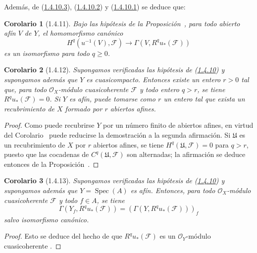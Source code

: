 \documentclass[10pt,oneside,openany]{book}
\theoremstyle{egaenv}\newtheorem*{env}{---}
\theoremstyle{egastatement}
\newtheorem*{corollary}{Corolario}
\theoremstyle{egadescription}
\renewcommand{\geq}{\geqslant}
\begin{document}
Además, de (\hyperref[III.1.4.10.3]{1.4.10.3}), (\hyperref[III.1.4.10.2]{1.4.10.2}) y (\hyperref[III.1.4.10.1]{1.4.10.1}) se deduce que:
\begin{corollary}[1.4.11]
\label{III.1.4.11}
\label{III.1.4.11-fr}
Bajo las hipótesis de la Proposición~, para todo abierto afín $V$ de $Y$, el homomorfismo canónico
\begin{equation}
\label{III.1.4.11.1-fr}
\tag{1.4.11.1}
H^q(u^{-1}(V),\mathcal F)\longrightarrow
\Gamma(V,R^qu_*(\mathcal F))
\end{equation}
es un isomorfismo para todo $q\geq0$.
\end{corollary}

\begin{corollary}[1.4.12]
\label{III.1.4.12-fr}
Supongamos verificadas las hipótesis de \textup{(\hyperref[III.1.4.10-fr]{1.4.10})} y supongamos además que $Y$ es cuasicompacto.
Entonces existe un entero $r>0$ tal que, para todo $\mathcal O_X$-módulo cuasicoherente $\mathcal F$ y todo entero $q>r$, se tiene $R^qu_*(\mathcal F)=0$.
Si $Y$ es afín, puede tomarse como $r$ un entero tal que exista un recubrimiento de $X$ formado por $r$ abiertos afines.
\end{corollary}

\begin{proof}
Como puede recubrirse $Y$ por un número finito de abiertos afines, en virtud del Corolario~ puede reducirse la demostración a la segunda afirmación.
Si $\mathfrak U$ es un recubrimiento de $X$ por $r$ abiertos afines, se tiene $H^q(\mathfrak U,\mathcal F)=0$ para $q>r$, puesto que las cocadenas de $C^q(\mathfrak U,\mathcal F)$ son alternadas; la afirmación se deduce entonces de la Proposición~.
\end{proof}

\begin{corollary}[1.4.13]
\label{III.1.4.13-fr}
Supongamos verificadas las hipótesis de \textup{(\hyperref[III.1.4.10-fr]{1.4.10})} y supongamos además que $Y=\operatorname{Spec}(A)$ es afín.
Entonces, para todo $\mathcal O_X$-módulo cuasicoherente $\mathcal F$ y todo $f\in A$, se tiene
\[
\Gamma(Y_f,R^qu_*(\mathcal F))
=(\Gamma(Y,R^qu_*(\mathcal F)))_f
\]
salvo isomorfismo canónico.
\end{corollary}

\begin{proof}
Esto se deduce del hecho de que $R^qu_*(\mathcal F)$ es un $\mathcal O_Y$-módulo cuasicoherente .
\end{proof}
\end{document}
